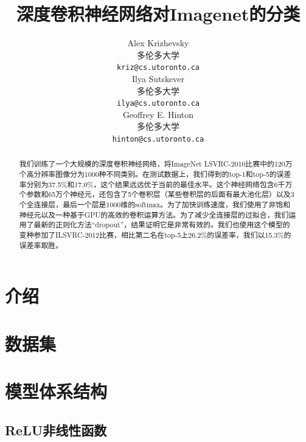\documentclass[12pt]{article}
\title{深度卷积神经网络对\textsf{Imagenet}的分类}
\author{
  Alex Krizhevsky \\
  多伦多大学\\
  \texttt{kriz@cs.utoronto.ca} \\
   \And
 Ilya Sutskever \\
  多伦多大学\\
  \texttt{ilya@cs.utoronto.ca} \\
  \And
 Geoffrey E. Hinton\\
  多伦多大学\\
  \texttt{hinton@cs.utoronto.ca}
}
\date{}
\begin{document}
\begin{CJK*}{UTF8}{gkai}\CJKindent
\maketitle

\renewcommand{\abstractname}{\Large摘要}
\begin{abstract}

我们训练了一个大规模的深度卷积神经网络，将ImageNet LSVRC-2010比赛中的120万个高分辨率图像分为1000种不同类别。在测试数据上，我们得到的top-1和top-5的误差率分别为37.5\%和17.0\%，这个结果远远优于当前的最佳水平。这个神经网络包含6千万个参数和65万个神经元，还包含了5个卷积层（某些卷积层的后面有最大池化层）以及3个全连接层，最后一个层是1000维的softmax。为了加快训练速度，我们使用了非饱和神经元以及一种基于GPU的高效的卷积运算方法。为了减少全连接层的过拟合，我们运用了最新的正则化方法“dropout”，结果证明它是非常有效的。我们也使用这个模型的变种参加了ILSVRC-2012比赛，相比第二名在top-5上26.2\%的误差率，我们以15.3\%的误差率取胜。
\end{abstract}




\section{介绍}



\section{数据集}



\section{模型体系结构}



\subsection{ReLU非线性函数}



\end{CJK*}
\end{document}
